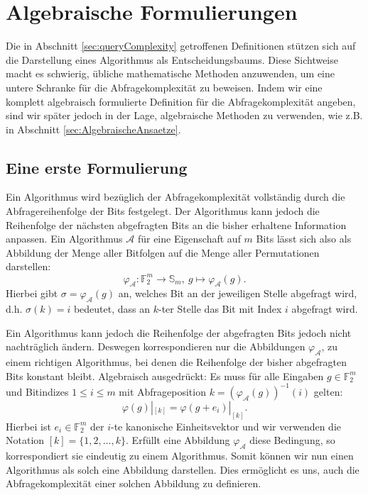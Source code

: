 \documentclass[10pt,a4paper, footheight=1mm, bibliography=totoc]{scrreprt}
\theoremstyle{definition}
\begin{document}
\section{Algebraische Formulierungen}

Die in Abschnitt \ref{sec:queryComplexity} getroffenen
Definitionen stützen sich auf die Darstellung eines 
Algorithmus als Entscheidungsbaums.
Diese Sichtweise macht es schwierig, übliche mathematische
Methoden anzuwenden, um eine untere Schranke für die
Abfragekomplexität zu beweisen.
Indem wir eine komplett algebraisch
formulierte Definition für die Abfragekomplexität angeben,
sind wir später jedoch in der Lage, algebraische Methoden zu verwenden,
wie z.B. in Abschnitt \ref{sec:AlgebraischeAnsaetze}.

\subsection{Eine erste Formulierung}
\label{sec:AlgebraischeCharakterisierung}
Ein Algorithmus wird bezüglich der Abfragekomplexität vollständig
durch die Abfragereihenfolge der Bits festgelegt.
Der Algorithmus kann jedoch die Reihenfolge der nächsten
abgefragten Bits an die bisher erhaltene Information anpassen.
Ein Algorithmus $\mathcal{A}$ für eine Eigenschaft
auf $m$ Bits lässt sich also als Abbildung der Menge aller
Bitfolgen auf die Menge aller Permutationen darstellen:
$$ \varphi_\mathcal{A}: \mathbb{F}_2^m \to \mathbb{S}_m,
   ~g \mapsto \varphi_\mathcal{A}(g).$$
Hierbei gibt $\sigma = \varphi_\mathcal{A}(g)$ an, welches
Bit an der jeweiligen Stelle abgefragt wird,
d.h. $\sigma(k)=i$ bedeutet, dass an $k$-ter
Stelle das Bit mit Index $i$ abgefragt wird.

Ein Algorithmus kann jedoch die Reihenfolge der 
abgefragten Bits jedoch nicht nachträglich ändern. Deswegen
korrespondieren nur die Abbildungen $\varphi_\mathcal{A}$,
zu einem richtigen Algorithmus, bei denen die Reihenfolge
der bisher abgefragten Bits konstant bleibt.
Algebraisch ausgedrückt: Es muss für alle Eingaben
$g\in \mathbb{F}_2^m$ und Bitindizes $1\leq i \leq m$
mit Abfrageposition $k=(\varphi_\mathcal{A}(g))^{-1}(i)$
gelten:
\begin{equation}
\label{eq:NichtNachtraeglichAendern}
\varphi(g)|_{[k]} = \varphi(g+e_i)|_{[k]}.
\end{equation}
Hierbei ist $e_i\in \mathbb{F}_2^m$
der $i$-te kanonische Einheitsvektor
und wir verwenden die Notation $[k]=\{1,2, \dots, k\}$.
Erfüllt eine Abbildung $\varphi_\mathcal{A}$ diese
Bedingung, so korrespondiert sie eindeutig
zu einem Algorithmus. Somit können wir nun
einen Algorithmus als solch eine Abbildung darstellen.
Dies ermöglicht es uns, auch die Abfragekomplexität
einer solchen Abbildung zu definieren.
\end{document}
